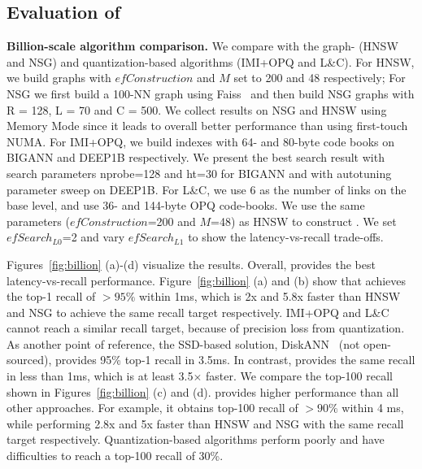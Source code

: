 \subsection{Evaluation of \name}
\label{subsec:eval-hmann}

\textbf{Billion-scale algorithm comparison.} We compare \algoname with the graph- (HNSW and NSG) and quantization-based algorithms (IMI+OPQ and L\&C).
For HNSW, we build graphs with $efConstruction$ and $M$ set to 200 and 48 respectively; For NSG we first build a 100-NN graph using Faiss~\cite{faiss} and then build NSG graphs with R = 128, L = 70 and C = 500. 
We collect results on NSG and HNSW using Memory Mode since it leads to overall better performance than using first-touch NUMA.
For IMI+OPQ, we build indexes with 64- and 80-byte code books on BIGANN and DEEP1B respectively. We present the best search result with search parameters nprobe=128 and ht=30 for BIGANN and with autotuning parameter sweep on DEEP1B. For L\&C,  we use 6 as the number of links on the base level, and use 36- and 144-byte OPQ code-books. We use the same parameters ($efConstruction$=200 and $M$=48) as HNSW to construct \name. We set $efSearch_{L0}$=2 and vary $efSearch_{L1}$ to show the latency-vs-recall trade-offs.

Figures~\ref{fig:billion} (a)-(d) visualize the results. Overall, \algoname provides the best latency-vs-recall performance. Figure~\ref{fig:billion} (a) and (b) show that \algoname achieves the top-1 recall of $>95\%$ within 1ms, which is 2x and 5.8x faster than HNSW and NSG to achieve the same recall target respectively.  
IMI+OPQ and L\&C cannot reach a similar recall target, because of precision loss from quantization. As another point of reference, the SSD-based solution, DiskANN~\cite{diskann} (not open-sourced), provides 95\% top-1 recall in 3.5ms. In contrast, \name provides the same recall in less than 1ms, which is at least 3.5\(\times\) faster.
We compare the top-100 recall shown in Figures~\ref{fig:billion} (c) and (d). \algoname provides higher performance than all other approaches. For example, it obtains top-100 recall of $>90\%$ within 4 ms, while performing 2.8x and 5x faster than HNSW and NSG with the same recall target respectively. Quantization-based algorithms perform poorly and have difficulties to reach a top-100 recall of 30\%. 

